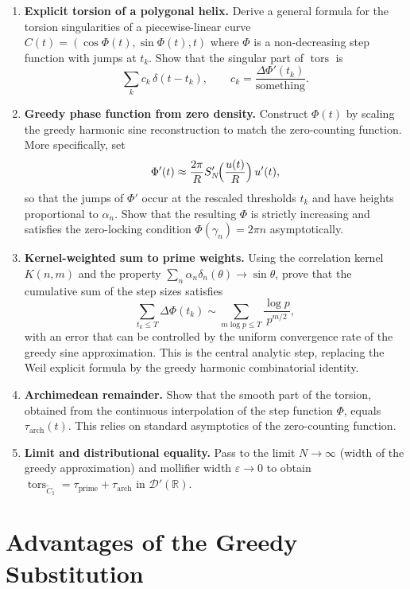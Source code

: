 \documentclass[12pt,a4paper]{article}
\newcommand{\R}{\mathbb{R}}
\newcommand{\dist}{\mathcal{D}'}
\newcommand{\tors}{\operatorname{tors}}
\begin{document}
\begin{enumerate}[label=(\arabic*)]
\item \textbf{Explicit torsion of a polygonal helix.}  
Derive a general formula for the torsion singularities of a piecewise-linear curve \(C(t)=(\cos\Phi(t),\sin\Phi(t),t)\) where \(\Phi\) is a non-decreasing step function with jumps at \(t_k\).  Show that the singular part of \(\tors\) is
\[
\sum_k c_k\,\delta(t-t_k),\qquad c_k = \frac{\Delta\Phi'(t_k)}{\text{something}} .
\]

\item \textbf{Greedy phase function from zero density.}  
Construct \(\Phi(t)\) by scaling the greedy harmonic sine reconstruction to match the zero-counting function.  More specifically, set
\[
\Phi'(t) \approx \frac{2\pi}{R} S'_{N}\!\Bigl(\frac{u(t)}{R}\Bigr)\, u'(t),
\]
so that the jumps of \(\Phi'\) occur at the rescaled thresholds \(t_k\) and have heights proportional to \(\alpha_n\).  Show that the resulting \(\Phi\) is strictly increasing and satisfies the zero-locking condition \(\Phi(\gamma_n)=2\pi n\) asymptotically.

\item \textbf{Kernel-weighted sum to prime weights.}  
Using the correlation kernel \(K(n,m)\) and the property \(\sum_n \alpha_n \delta_n(\theta)\to\sin\theta\), prove that the cumulative sum of the step sizes satisfies
\[
\sum_{t_k\le T} \Delta\Phi(t_k) \sim \sum_{m\log p\le T} \frac{\log p}{p^{m/2}},
\]
with an error that can be controlled by the uniform convergence rate of the greedy sine approximation.  This is the central analytic step, replacing the Weil explicit formula by the greedy harmonic combinatorial identity.

\item \textbf{Archimedean remainder.}  
Show that the smooth part of the torsion, obtained from the continuous interpolation of the step function \(\Phi\), equals \(\tau_{\mathrm{arch}}(t)\).  This relies on standard asymptotics of the zero-counting function.

\item \textbf{Limit and distributional equality.}  
Pass to the limit \(N\to\infty\) (width of the greedy approximation) and mollifier width \(\varepsilon\to0\) to obtain \(\tors_{\widetilde{C}_1} = \tau_{\mathrm{prime}} + \tau_{\mathrm{arch}}\) in \(\dist(\R)\).
\end{enumerate}

\section{Advantages of the Greedy Substitution}
\end{document}
